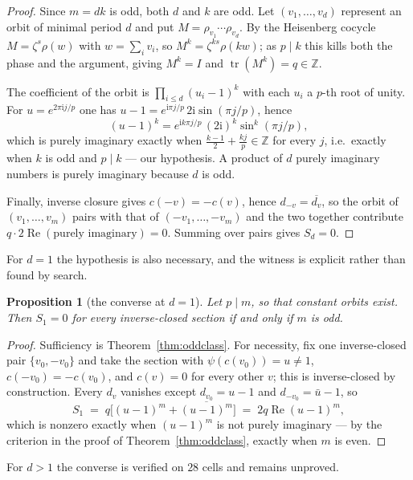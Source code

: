\documentclass[11pt]{article}
\theoremstyle{plain}
\newtheorem{proposition}[theorem]{Proposition}
\theoremstyle{definition}
\newcommand{\ZZ}{\mathbb Z}
\newcommand{\tr}{\operatorname{tr}}
\begin{document}
\begin{proof}
Since $m=dk$ is odd, both $d$ and $k$ are odd. Let $(v_1,\dots,v_d)$ represent
an orbit of minimal period $d$ and put $M=\rho_{v_1}\cdots\rho_{v_d}$. By the
Heisenberg cocycle $M=\zeta^{s}\rho(w)$ with $w=\sum_i v_i$, so
$M^{k}=\zeta^{ks}\rho(kw)$; as $p\mid k$ this kills both the phase and the
argument, giving $M^{k}=I$ and $\tr(M^{k})=q\in\ZZ$.

The coefficient of the orbit is $\prod_{i\le d}(u_i-1)^{k}$ with each $u_i$ a
$p$-th root of unity. For $u=e^{2\pi\mathrm{i}j/p}$ one has
$u-1=e^{\mathrm{i}\pi j/p}\,2\mathrm{i}\sin(\pi j/p)$, hence
\[
(u-1)^{k}=e^{\mathrm{i}k\pi j/p}\,(2\mathrm{i})^{k}\sin^{k}(\pi j/p),
\]
which is purely imaginary exactly when $\tfrac{k-1}{2}+\tfrac{kj}{p}\in\ZZ$ for
every $j$, i.e.\ exactly when $k$ is odd and $p\mid k$ --- our hypothesis. A
product of $d$ purely imaginary numbers is purely imaginary because $d$ is odd.

Finally, inverse closure gives $c(-v)=-c(v)$, hence $d_{-v}=\overline{d_v}$, so
the orbit of $(v_1,\dots,v_m)$ pairs with that of $(-v_1,\dots,-v_m)$ and the
two together contribute $q\cdot 2\operatorname{Re}(\text{purely imaginary})=0$.
Summing over pairs gives $S_d=0$.
\end{proof}

For $d=1$ the hypothesis is also necessary, and the witness is explicit rather
than found by search.

\begin{proposition}[the converse at $d=1$]\label{prop:converse1}
Let $p\mid m$, so that constant orbits exist. Then $S_1=0$ for every
inverse-closed section if and only if $m$ is odd.
\end{proposition}

\begin{proof}
Sufficiency is Theorem~\ref{thm:oddclass}. For necessity, fix one
inverse-closed pair $\{v_0,-v_0\}$ and take the section with
$\psi(c(v_0))=u\neq1$, $c(-v_0)=-c(v_0)$, and $c(v)=0$ for every other $v$;
this is inverse-closed by construction. Every $d_v$ vanishes except
$d_{v_0}=u-1$ and $d_{-v_0}=\bar u-1$, so
\[
S_1 \;=\; q\bigl[(u-1)^{m}+\overline{(u-1)^{m}}\bigr]
\;=\; 2q\operatorname{Re}(u-1)^{m},
\]
which is nonzero exactly when $(u-1)^m$ is not purely imaginary --- by the
criterion in the proof of Theorem~\ref{thm:oddclass}, exactly when $m$ is even.
\end{proof}

\noindent For $d>1$ the converse is verified on $28$ cells and remains
unproved.
\end{document}
